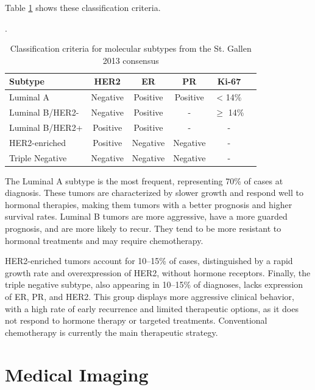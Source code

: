 \documentclass[a4paper,10pt]{book}
\begin{document}
Table \ref{tab:molecular_subtypes_comb} shows these classification criteria.

\begin{table}[h!]
	\centering
        \caption[Breast cancer molecular subtypes classification criteria]{Classification criteria for molecular subtypes from the St. Gallen 2013 consensus \cite{goldhirsch_personalizing_2013}}.
	\begin{tabular}{lccccc}
		\toprule
		\textbf{Subtype} & \textbf{HER2} & \textbf{ER} & \textbf{PR} & \textbf{Ki-67} \\
		\midrule
		Luminal A        & Negative      & Positive    & Positive    & < 14\%         \\
		Luminal B/HER2-  & Negative      & Positive    & -           & $\geq$ 14\%    \\
		Luminal B/HER2+  & Positive      & Positive    & -           & -              \\
		HER2-enriched    & Positive      & Negative    & Negative    & -              \\
		Triple Negative  & Negative      & Negative    & Negative    & -              \\
		\bottomrule
	\end{tabular}
	\label{tab:molecular_subtypes_comb}
\end{table}

The Luminal A subtype is the most frequent, representing 70\% of cases at diagnosis. These tumors are characterized by slower growth and respond well to hormonal therapies, making them tumors with a better prognosis and higher survival rates. Luminal B tumors are more aggressive, have a more guarded prognosis, and are more likely to recur. They tend to be more resistant to hormonal treatments and may require chemotherapy.

HER2-enriched tumors account for 10–15\% of cases, distinguished by a rapid growth rate and overexpression of HER2, without hormone receptors. Finally, the triple negative subtype, also appearing in 10–15\% of diagnoses, lacks expression of ER, PR, and HER2. This group displays more aggressive clinical behavior, with a high rate of early recurrence and limited therapeutic options, as it does not respond to hormone therapy or targeted treatments. Conventional chemotherapy is currently the main therapeutic strategy.

\section{Medical Imaging}
\end{document}
